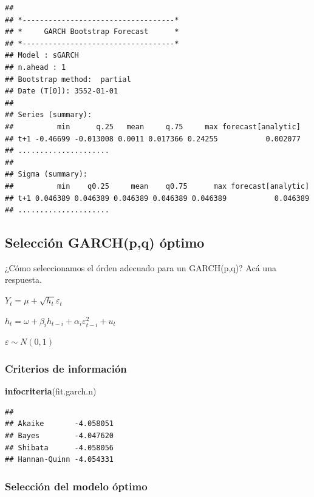 \documentclass[
]{book}
\newenvironment{Shaded}{\begin{snugshade}}{\end{snugshade}}
\newcommand{\FunctionTok}[1]{\textcolor[rgb]{0.13,0.29,0.53}{\textbf{#1}}}
\newcommand{\NormalTok}[1]{#1}
\begin{document}
\begin{verbatim}
## 
## *-----------------------------------*
## *     GARCH Bootstrap Forecast      *
## *-----------------------------------*
## Model : sGARCH
## n.ahead : 1
## Bootstrap method:  partial
## Date (T[0]): 3552-01-01
## 
## Series (summary):
##          min      q.25   mean     q.75     max forecast[analytic]
## t+1 -0.46699 -0.013008 0.0011 0.017366 0.24255           0.002077
## .....................
## 
## Sigma (summary):
##          min    q0.25     mean    q0.75      max forecast[analytic]
## t+1 0.046389 0.046389 0.046389 0.046389 0.046389           0.046389
## .....................
\end{verbatim}

\hypertarget{selecciuxf3n-garchpq-uxf3ptimo}{%
\subsection{Selección GARCH(p,q) óptimo}\label{selecciuxf3n-garchpq-uxf3ptimo}}

¿Cómo seleccionamos el órden adecuado para un GARCH(p,q)? Acá una respuesta.

\(Y_t = \mu+\sqrt{h_t}\varepsilon_t\)

\(h_t = \omega+\beta_ih_{t-i}+\alpha_i\varepsilon^2_{t-i}+u_t\)

\(\varepsilon \sim N(0,1)\)

\hypertarget{criterios-de-informaciuxf3n}{%
\subsubsection{Criterios de información}\label{criterios-de-informaciuxf3n}}

\begin{Shaded}
\begin{Highlighting}[]
\FunctionTok{infocriteria}\NormalTok{(fit.garch.n)}
\end{Highlighting}
\end{Shaded}

\begin{verbatim}
##                       
## Akaike       -4.058051
## Bayes        -4.047620
## Shibata      -4.058056
## Hannan-Quinn -4.054331
\end{verbatim}

\hypertarget{selecciuxf3n-del-modelo-uxf3ptimo}{%
\subsubsection{Selección del modelo óptimo}\label{selecciuxf3n-del-modelo-uxf3ptimo}}
\end{document}

